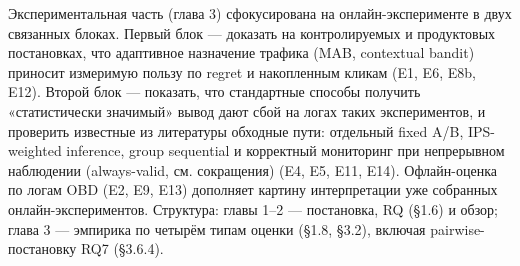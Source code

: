 Экспериментальная часть (глава 3) сфокусирована на онлайн-эксперименте в двух связанных блоках. Первый блок --- доказать на контролируемых и продуктовых постановках, что адаптивное назначение трафика (MAB, contextual bandit) приносит измеримую пользу по regret и накопленным кликам (E1, E6, E8b, E12). Второй блок --- показать, что стандартные способы получить «статистически значимый» вывод дают сбой на логах таких экспериментов, и проверить известные из литературы обходные пути: отдельный fixed A/B, IPS-weighted inference, group sequential и корректный мониторинг при непрерывном наблюдении (always-valid, см. сокращения) (E4, E5, E11, E14). Офлайн-оценка по логам OBD (E2, E9, E13) дополняет картину интерпретации уже собранных онлайн-экспериментов. Структура: главы 1--2 --- постановка, RQ (§1.6) и обзор; глава 3 --- эмпирика по четырём типам оценки (§1.8, §3.2), включая pairwise-постановку RQ7 (§3.6.4).
